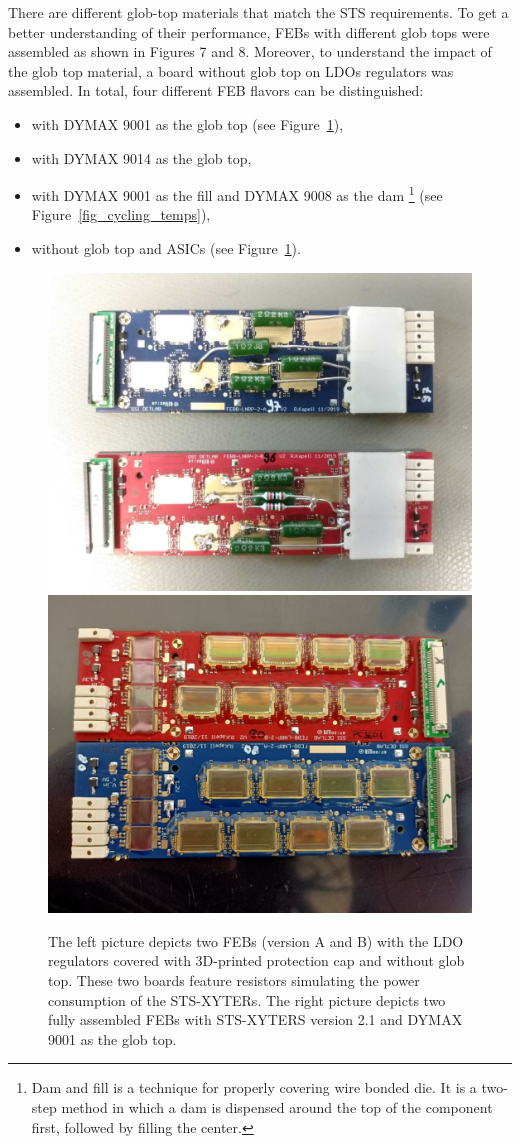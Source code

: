 There are different glob-top materials that match the \gls{STS} requirements. To get a better understanding of
their performance, \glspl{FEB} with different glob tops were assembled as shown in Figures 7 and 8. Moreover,
to understand the impact of the glob top material, a board without glob top on \glspl{LDO} regulators was
assembled. In total, four different FEB flavors can be distinguished:
\begin{itemize}
    \item with DYMAX 9001 as the glob top (see Figure~\ref{fig_noglobtop}),
    \item with DYMAX 9014 as the glob top,
    \item with DYMAX 9001 as the fill and DYMAX 9008 as the dam \footnote{Dam and fill is a technique for properly covering wire bonded die. It is a two-step method in which a dam is dispensed around the top of the component first, followed by filling the center.} (see Figure~\ref{fig_cycling_temps}), 
    \item without glob top and \glspl{ASIC} (see Figure~\ref{fig_noglobtop}).
    \end{itemize}
\begin{figure}[!h]
\centering
\includegraphics[width=0.45\columnwidth]{Chapter4/images/noglobtop.jpg}
\includegraphics[width=0.45\columnwidth]{Chapter4/images/globtop.jpg}
\caption{The left picture depicts two \glspl{FEB} (version A and B) with the \gls{LDO} regulators covered with 3D-printed protection cap and without glob top. These two boards feature resistors simulating the power consumption of the STS-XYTERs.
The right picture depicts two fully assembled \gls{FEB}s with STS-XYTERS version 2.1 and DYMAX 9001 as the glob top.}
\label{fig_noglobtop}
\end{figure}
